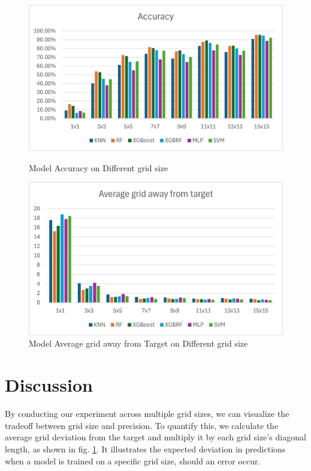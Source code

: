 \documentclass[runningheads]{llncs}
\begin{document}
\vspace{-10pt}
\begin{figure}[hbt!]
	\begin{minipage}{0.45\textwidth}
		\centering
		\includegraphics[scale=0.5]{image3.png}
		\caption{Model Accuracy on Different grid size}
		\label{fig:acc_dgird_size}
	\end{minipage}
	\hfill
	\begin{minipage}{0.45\textwidth}
		\centering
		\includegraphics[scale=0.5]{image1.png}
		\caption{Model Average grid away from Target on Different grid size}
		\label{fig:AGT_dgrid_size}
	\end{minipage}
\end{figure}

\vspace{-30pt}
\section{Discussion}
By conducting our experiment across multiple grid sizes, we can visualize the tradeoff between grid size and precision. To quantify this, we calculate the average grid deviation from the target and multiply it by each grid size’s diagonal length, as shown in fig. \ref{fig:AGT_dgrid_size}. It illustrates the expected deviation in predictions when a model is trained on a specific grid size, should an error occur.
\end{document}
